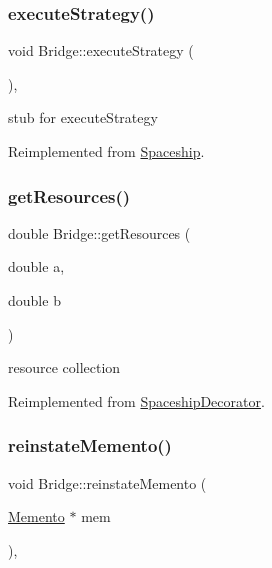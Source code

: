 \subsubsection{\texorpdfstring{execute\+Strategy()}{executeStrategy()}}
{\footnotesize\ttfamily void Bridge\+::execute\+Strategy (\begin{DoxyParamCaption}{ }\end{DoxyParamCaption})\hspace{0.3cm}{\ttfamily [inline]}, {\ttfamily [virtual]}}

stub for execute\+Strategy 

Reimplemented from \hyperlink{classSpaceship}{Spaceship}.

\mbox{\label{classBridge_a1508c1c9cfb44850fea31afcb7f1e403}} 
\subsubsection{\texorpdfstring{get\+Resources()}{getResources()}}
{\footnotesize\ttfamily double Bridge\+::get\+Resources (\begin{DoxyParamCaption}\item[{double}]{a,  }\item[{double}]{b }\end{DoxyParamCaption})\hspace{0.3cm}{\ttfamily [virtual]}}

resource collection 

Reimplemented from \hyperlink{classSpaceshipDecorator_a5ee7a9a8c146c85f08591e47d971dce7}{Spaceship\+Decorator}.

\mbox{\label{classBridge_a3d551c6ea3d807c08a32214df2589ecc}} 
\subsubsection{\texorpdfstring{reinstate\+Memento()}{reinstateMemento()}}
{\footnotesize\ttfamily void Bridge\+::reinstate\+Memento (\begin{DoxyParamCaption}\item[{\hyperlink{classMemento}{Memento} $\ast$}]{mem }\end{DoxyParamCaption})\hspace{0.3cm}{\ttfamily [inline]}, {\ttfamily [virtual]}}

